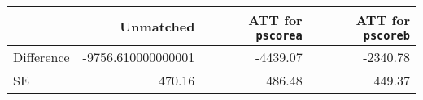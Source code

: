 \begin{table}[h!]
\begin{center}
\begin{tabular}{lrrr}
\toprule
& Unmatched & ATT for \texttt{pscorea} & ATT for \texttt{pscoreb}  \\
\hline
Difference & -9756.610000000001 & -4439.07 & -2340.78 \\
SE & 470.16 & 486.48 & 449.37 \\
\bottomrule
\end{tabular}
\end{center}
\end{table}
